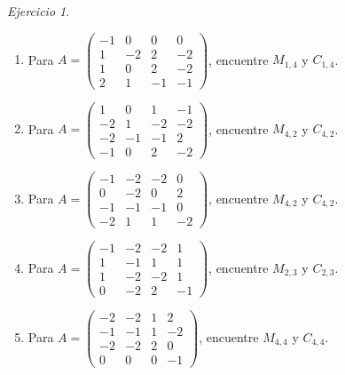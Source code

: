 \documentclass[12pt]{article}
\theoremstyle{remark}
\newtheorem{Ejer}[definicion]{Ejercicio}
\begin{document}
\begin{Ejer}
\begin{enumerate}[resume=banco]
\item Para $A=\begin{pmatrix}-1&0&0&0\\1&-2&2&-2\\1&0&2&-2\\2&1&-1&-1\end{pmatrix}$, encuentre $M_{1,4}$ y $C_{1,4}$.

\item Para $A=\begin{pmatrix}1&0&1&-1\\-2&1&-2&-2\\-2&-1&-1&2\\-1&0&2&-2\end{pmatrix}$, encuentre $M_{4,2}$ y $C_{4,2}$.

\item Para $A=\begin{pmatrix}-1&-2&-2&0\\0&-2&0&2\\-1&-1&-1&0\\-2&1&1&-2\end{pmatrix}$, encuentre $M_{4,2}$ y $C_{4,2}$.

\item Para $A=\begin{pmatrix}-1&-2&-2&1\\1&-1&1&1\\1&-2&-2&1\\0&-2&2&-1\end{pmatrix}$, encuentre $M_{2,3}$ y $C_{2,3}$.

\item Para $A=\begin{pmatrix}-2&-2&1&2\\-1&-1&1&-2\\-2&-2&2&0\\0&0&0&-1\end{pmatrix}$, encuentre $M_{4,4}$ y $C_{4,4}$.

\end{enumerate}
\end{Ejer}
\end{document}
